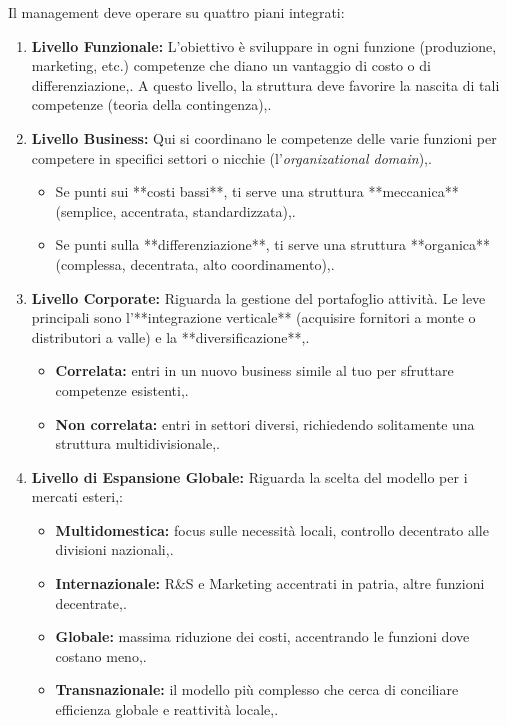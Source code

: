 \documentclass[a4paper,10pt]{article}
\begin{document}
Il management deve operare su quattro piani integrati:

\begin{enumerate}
    \item \textbf{Livello Funzionale:} L'obiettivo è sviluppare in ogni funzione (produzione, marketing, etc.) competenze che diano un vantaggio di costo o di differenziazione,. A questo livello, la struttura deve favorire la nascita di tali competenze (teoria della contingenza),.
    \item \textbf{Livello Business:} Qui si coordinano le competenze delle varie funzioni per competere in specifici settori o nicchie (l'\textit{organizational domain}),. 
    \begin{itemize}
        \item Se punti sui **costi bassi**, ti serve una struttura **meccanica** (semplice, accentrata, standardizzata),.
        \item Se punti sulla **differenziazione**, ti serve una struttura **organica** (complessa, decentrata, alto coordinamento),.
    \end{itemize}
    \item \textbf{Livello Corporate:} Riguarda la gestione del portafoglio attività. Le leve principali sono l'**integrazione verticale** (acquisire fornitori a monte o distributori a valle) e la **diversificazione**,. 
    \begin{itemize}
        \item \textbf{Correlata:} entri in un nuovo business simile al tuo per sfruttare competenze esistenti,.
        \item \textbf{Non correlata:} entri in settori diversi, richiedendo solitamente una struttura multidivisionale,.
    \end{itemize}
    \item \textbf{Livello di Espansione Globale:} Riguarda la scelta del modello per i mercati esteri,:
    \begin{itemize}
        \item \textbf{Multidomestica:} focus sulle necessità locali, controllo decentrato alle divisioni nazionali,.
        \item \textbf{Internazionale:} R\&S e Marketing accentrati in patria, altre funzioni decentrate,.
        \item \textbf{Globale:} massima riduzione dei costi, accentrando le funzioni dove costano meno,.
        \item \textbf{Transnazionale:} il modello più complesso che cerca di conciliare efficienza globale e reattività locale,.
    \end{itemize}
\end{enumerate}
\end{document}
